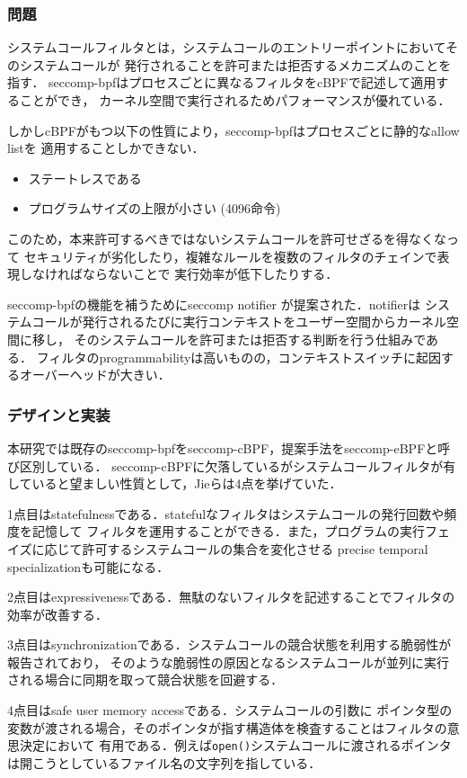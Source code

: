 \documentclass[platex,a4j,10pt,twoside,twocolumn,dvipdfmx]{jsarticle}
\begin{document}
\subsubsection{問題}
システムコールフィルタとは，システムコールのエントリーポイントにおいてそのシステムコールが
発行されることを許可または拒否するメカニズムのことを指す．
seccomp-bpfはプロセスごとに異なるフィルタをcBPFで記述して適用することができ，
カーネル空間で実行されるためパフォーマンスが優れている．

しかしcBPFがもつ以下の性質により，seccomp-bpfはプロセスごとに静的なallow listを
適用することしかできない．
\begin{itemize}
  \item ステートレスである
  \item プログラムサイズの上限が小さい (4096命令)
\end{itemize}
このため，本来許可するべきではないシステムコールを許可せざるを得なくなって
セキュリティが劣化したり，複雑なルールを複数のフィルタのチェインで表現しなければならないことで
実行効率が低下したりする．

seccomp-bpfの機能を補うためにseccomp notifier \cite{TheSecco46:online} が提案された．notifierは
システムコールが発行されるたびに実行コンテキストをユーザー空間からカーネル空間に移し，
そのシステムコールを許可または拒否する判断を行う仕組みである．
フィルタのprogrammabilityは高いものの，コンテキストスイッチに起因するオーバーヘッドが大きい．

\subsubsection{デザインと実装}
本研究では既存のseccomp-bpfをseccomp-cBPF，提案手法をseccomp-eBPFと呼び区別している．
seccomp-cBPFに欠落しているがシステムコールフィルタが有していると望ましい性質として，Jieらは4点を挙げていた．

1点目はstatefulnessである．statefulなフィルタはシステムコールの発行回数や頻度を記憶して
フィルタを運用することができる．また，プログラムの実行フェイズに応じて許可するシステムコールの集合を変化させる
precise temporal specializationも可能になる．

2点目はexpressivenessである．無駄のないフィルタを記述することでフィルタの効率が改善する．

3点目はsynchronizationである．システムコールの競合状態を利用する脆弱性が報告されており，
そのような脆弱性の原因となるシステムコールが並列に実行される場合に同期を取って競合状態を回避する．

4点目はsafe user memory accessである．システムコールの引数に
ポインタ型の変数が渡される場合，そのポインタが指す構造体を検査することはフィルタの意思決定において
有用である．例えば\texttt{open()}システムコールに渡されるポインタは開こうとしているファイル名の文字列を指している．
\end{document}

